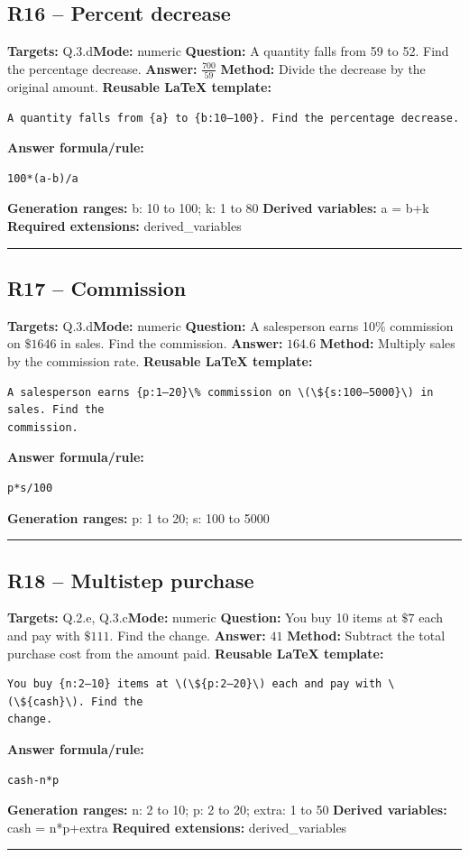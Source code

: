 \documentclass[11pt]{article}
\begin{document}
\subsection{R16 -- Percent decrease}
\textbf{Targets:} Q.3.d\quad\textbf{Mode:} numeric
\textbf{Question:} A quantity falls from 59 to 52. Find the percentage decrease.
\textbf{Answer:} \(\frac{700}{59}\)
\textbf{Method:} Divide the decrease by the original amount.
\textbf{Reusable LaTeX template:}
\begin{verbatim}
A quantity falls from {a} to {b:10–100}. Find the percentage decrease.
\end{verbatim}
\textbf{Answer formula/rule:}
\begin{verbatim}
100*(a-b)/a
\end{verbatim}
\textbf{Generation ranges:} b: 10 to 100; k: 1 to 80
\textbf{Derived variables:} a = b+k
\textbf{Required extensions:} derived\_variables
\medskip\hrule\medskip
\subsection{R17 -- Commission}
\textbf{Targets:} Q.3.d\quad\textbf{Mode:} numeric
\textbf{Question:} A salesperson earns 10\% commission on \(\$1646\) in sales. Find the commission.
\textbf{Answer:} \(164.6\)
\textbf{Method:} Multiply sales by the commission rate.
\textbf{Reusable LaTeX template:}
\begin{verbatim}
A salesperson earns {p:1–20}\% commission on \(\${s:100–5000}\) in sales. Find the
commission.
\end{verbatim}
\textbf{Answer formula/rule:}
\begin{verbatim}
p*s/100
\end{verbatim}
\textbf{Generation ranges:} p: 1 to 20; s: 100 to 5000
\medskip\hrule\medskip
\subsection{R18 -- Multistep purchase}
\textbf{Targets:} Q.2.e, Q.3.c\quad\textbf{Mode:} numeric
\textbf{Question:} You buy 10 items at \(\$7\) each and pay with \(\$111\). Find the change.
\textbf{Answer:} \(41\)
\textbf{Method:} Subtract the total purchase cost from the amount paid.
\textbf{Reusable LaTeX template:}
\begin{verbatim}
You buy {n:2–10} items at \(\${p:2–20}\) each and pay with \(\${cash}\). Find the
change.
\end{verbatim}
\textbf{Answer formula/rule:}
\begin{verbatim}
cash-n*p
\end{verbatim}
\textbf{Generation ranges:} n: 2 to 10; p: 2 to 20; extra: 1 to 50
\textbf{Derived variables:} cash = n*p+extra
\textbf{Required extensions:} derived\_variables
\medskip\hrule\medskip
\end{document}
